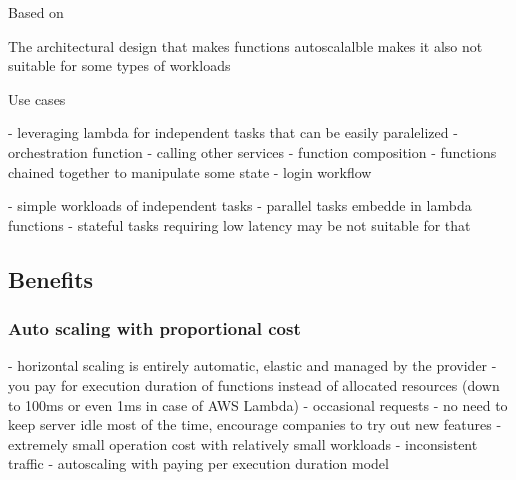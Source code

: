 









\noindent\makebox[\linewidth]{\rule{\paperwidth}{0.4pt}}

Based on
\cite{MartinFowlerServerless}
\cite{RobertsChapin2017}
\cite{BerkeleyServerless}
\cite{BerkeleyServerlessComputing}

The architectural design that makes functions autoscalalble makes it also not suitable for some types of workloads

Use cases

- leveraging lambda for independent tasks that can be easily paralelized
- orchestration function - calling other services
- function composition - functions chained together to manipulate some state - login workflow

- simple workloads of independent tasks - parallel tasks embedde in lambda functions
- stateful tasks requiring low latency may be not suitable for that

\subsection{Benefits} 

\subsubsection*{Auto scaling with proportional cost}

- horizontal scaling is entirely automatic, elastic and managed by the provider
- you pay for execution duration of functions instead of allocated resources (down to 100ms or even 1ms in case of AWS Lambda)
- occasional requests - no need to keep server idle most of the time, encourage companies to try out new features - extremely small operation cost with relatively small workloads
- inconsistent traffic - autoscaling with paying per execution duration model

